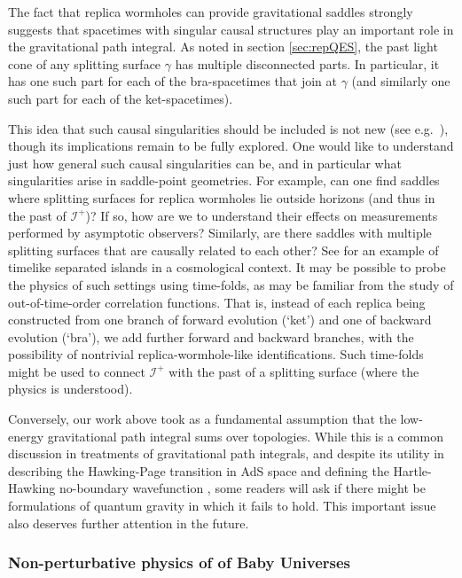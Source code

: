 \documentclass[letterpaper,12pt]{article}
\newcommand*{\scri}{\mathscr{I}} %
\begin{document}
The fact that replica wormholes can provide gravitational saddles strongly suggests that spacetimes with singular causal structures play an important role in the gravitational path integral.  As noted in section \ref{sec:repQES}, the past light cone of any splitting surface $\gamma$ has multiple disconnected parts.  In particular, it has one such part for each of the bra-spacetimes that join at $\gamma$ (and similarly one such part for each of the ket-spacetimes).

This idea that such causal singularities should be included is not new (see e.g.\ \cite{Louko:1995jw,Dowker:1997hj,Borde:1999md}), though its implications remain to be fully explored.  One would like to understand just how general such causal singularities can be, and in particular what singularities arise in saddle-point geometries.  For example, can one find saddles where splitting surfaces for replica wormholes lie outside horizons (and thus in the past of $\scri^+$)?  If so, how are we to understand their effects on measurements performed by asymptotic observers?  Similarly, are there saddles with multiple splitting surfaces that are causally related to each other? See \cite{Chen:2020tes} for an example of timelike separated islands in a cosmological context.  It may be possible to probe the physics of such settings using time-folds, as may be familiar from the study of out-of-time-order correlation functions. That is, instead of each replica being constructed from one branch of forward evolution (`ket') and one of backward evolution (`bra'), we add further forward and backward branches, with the possibility of nontrivial replica-wormhole-like identifications. Such time-folds might be used to connect $\scri^+$ with the past of a splitting surface (where the physics is understood).

Conversely, our work above took as a fundamental assumption that the low-energy gravitational path integral sums over topologies.  While this is a common discussion in treatments of gravitational path integrals, and despite its utility in describing the Hawking-Page transition in AdS space \cite{Hawking:1982dh} and defining the Hartle-Hawking no-boundary wavefunction \cite{Hartle:1983ai}, some readers will ask if there might be formulations of quantum gravity in which it fails to hold.  This important issue also deserves further attention in the future.

\subsubsection{Non-perturbative physics of of Baby Universes}
\end{document}
